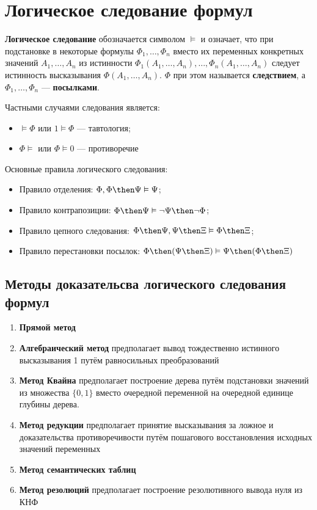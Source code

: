 \section{Логическое следование формул}
\dftion \textbf{Логическое следование} обозначается символом $\vDash$ и означает, что при подстановке в некоторые формулы $\Phi_1, \dots, \Phi_n$ вместо их переменных конкретных значений $A_1, \dots, A_n$ из истинности $\Phi_1(A_1,\dots,A_n),\dots,\Phi_n(A_1,\dots,A_n)$ следует истинность высказывания $\Phi(A_1,\dots,A_n)$. $\Phi$ при этом называется \textbf{следствием}, а $\Phi_1, \dots, \Phi_n$ --- \textbf{посылками}.

Частными случаями следования является:
\begin{itemize}
    \item $\vDash \Phi$ или $1 \vDash \Phi$ --- тавтология;
    \item $\Phi \vDash$ или $\Phi \vDash 0$ --- противоречие
\end{itemize}

Основные правила логического следования:
\begin{itemize}
    \item Правило отделения: $\Phi, \Phi \then \Psi \vDash \Psi$;
    \item Правило контрапозиции: $\Phi \then \Psi \vDash \lnot \Psi \then \lnot \Phi$;
    \item Правило цепного следования: $\Phi \then \Psi, \Psi \then \Xi \vDash \Phi \then \Xi$;
    \item Правило перестановки посылок: $\Phi \then (\Psi \then \Xi) \vDash \Psi \then (\Phi \then \Xi)$
\end{itemize}

\subsection{Методы доказательсва логического следования формул}
\begin{enumerate}
    \item \textbf{Прямой метод}
    \item \textbf{Алгебраический метод} предполагает вывод тождественно истинного высказывания 1 путём равносильных преобразований
    \item \textbf{Метод Квайна} предполагает построение дерева путём подстановки значений из множества $\{0,1\}$ вместо очередной переменной на очередной единице глубины дерева.
    \item \textbf{Метод редукции} предполагает принятие высказывания за ложное и доказательства противоречивости путём пошагового восстановления исходных значений переменных
    \item \textbf{Метод семантических таблиц}
    \item \textbf{Метод резолюций} предполагает построение резолютивного вывода нуля из КНФ
\end{enumerate}

